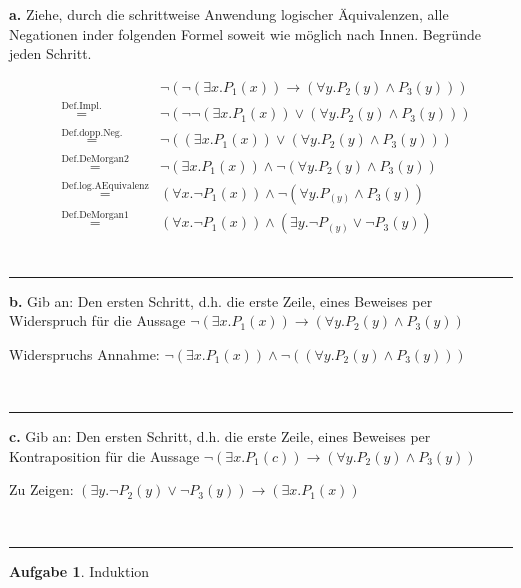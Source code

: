 \documentclass[10pt,leqno ]{article}
\newcommand\customeq[1]{\overset{\mathrm{#1}}{=}}
\theoremstyle{definition}
\newtheorem{problem}[theorem]{Aufgabe}
\newenvironment{solution}[1][L]{\begin{doublespace}\textbf{#1.}\quad }{\ \rule{0.5em}{0.5em}\end{doublespace}}
\begin{document}
\begin{solution}[a]
    Ziehe, durch die schrittweise Anwendung logischer Äquivalenzen, alle Negationen inder folgenden Formel soweit wie möglich nach Innen. Begründe jeden Schritt.

    \begin{equation*}
        \begin{aligned}
        && \lnot(\lnot(\exists x . P_1(x)) \rightarrow (\forall y . P_2(y) \land P_3(y))) \\
        & \customeq{Def. Impl.} & \lnot(\lnot \lnot(\exists x . P_1(x)) \lor (\forall y . P_2(y) \land P_3(y))) \\
        & \customeq{Def. dopp. Neg.} & \lnot((\exists x . P_1(x)) \lor (\forall y . P_2(y) \land P_3(y))) \\
        & \customeq{Def.DeMorgan2} & \lnot(\exists x . P_1(x)) \land \lnot (\forall y . P_2(y) \land P_3(y)) \\
        & \customeq{Def. log.AEquivalenz} & (\forall x . \lnot P_1(x)) \land \lnot (\forall y . P_(y) \land P_3(y)) \\
        & \customeq{Def. DeMorgan1} & (\forall x . \lnot P_1(x)) \land (\exists y . \lnot P_(y) \lor \lnot P_3(y)) \\
        \end{aligned}
    \end{equation*}
\end{solution}

\begin{solution}[b]
    Gib an: Den ersten Schritt, d.h. die erste Zeile, eines Beweises per Widerspruch für die
    Aussage \( \lnot(\exists x . P_1(x)) \rightarrow (\forall y . P_2(y) \land P_3(y)) \)

    Widerspruchs Annahme: \( \lnot(\exists x . P_1(x)) \land \lnot ((\forall y . P_2(y) \land P_3(y))) \)

\end{solution}

\begin{solution}[c]
    Gib an: Den ersten Schritt, d.h. die erste Zeile, eines Beweises per Kontraposition für die
    Aussage \( \lnot(\exists x . P_1(c)) \rightarrow (\forall y . P_2(y) \land P_3(y)) \)

    Zu Zeigen: \( (\exists y . \lnot P_2(y) \lor \lnot P_3(y)) \rightarrow (\exists x . P_1(x)) \)

\end{solution}

\begin{problem}
    Induktion
\end{problem}
\end{document}
